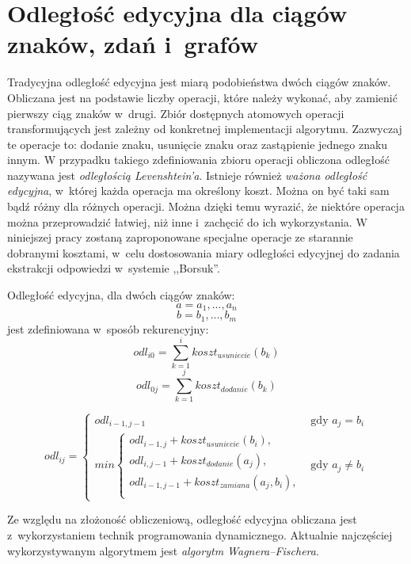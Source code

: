 \documentclass[a4paper, twoside, 12pt]{report}
\begin{document}
    \section{Odległość edycyjna dla ciągów znaków, zdań i~grafów}
        Tradycyjna odległość edycyjna jest miarą podobieństwa dwóch ciągów znaków. Obliczana jest na podstawie liczby
        operacji, które należy wykonać, aby zamienić pierwszy ciąg znaków w~drugi. Zbiór dostępnych atomowych operacji
        transformujących jest zależny od konkretnej implementacji algorytmu. Zazwyczaj te operacje to: dodanie znaku,
        usunięcie znaku oraz zastąpienie jednego znaku innym. W przypadku takiego zdefiniowania zbioru operacji
        obliczona odległość nazywana jest \emph{odległością  Levenshtein'a}. Istnieje również \emph{ważona odległość edycyjna},
        w~której każda operacja ma określony koszt. Można on być taki sam bądź różny dla różnych operacji. Można dzięki
        temu wyrazić, że niektóre operacja można przeprowadzić łatwiej, niż inne i~zachęcić do ich wykorzystania.
        W niniejszej pracy zostaną zaproponowane specjalne operacje ze starannie dobranymi kosztami, w~celu dostosowania
        miary odległości edycyjnej do zadania ekstrakcji odpowiedzi w~systemie ,,Borsuk''.

        Odległość edycyjna, dla dwóch ciągów znaków:
        $$ a = a_1, ..., a_n $$
        $$ b = b_1, ..., b_m $$
        jest zdefiniowana w~sposób rekurencyjny\cite{CORMEN}:
            $$ odl_{i0} = \sum\limits_{k=1}^{i} koszt_{usuniecie}(b_k) $$
            $$ odl_{0j} = \sum\limits_{k=1}^{j} koszt_{dodanie}(b_k) $$

            \[
             odl_{ij} =
              \begin{cases}
                  odl_{i-1,j-1} & \text{gdy } a_j = b_i \\
                  min
                    \begin{cases}
                        odl_{i-1,j} + koszt_{usuniecie}(b_i), \\
                        odl_{i,j-1} + koszt_{dodanie}(a_j), \\
                        odl_{i-1,j-1} + koszt_{zamiana}(a_j, b_i), \\
                    \end{cases}
                    & \text{gdy } a_j \neq b_i
              \end{cases}
            \]

        Ze względu na złożoność obliczeniową, odległość edycyjna obliczana jest z~wykorzystaniem technik programowania
        dynamicznego. Aktualnie najczęściej wykorzystywanym algorytmem jest \emph{algorytm Wagnera–Fischera}.
\end{document}
